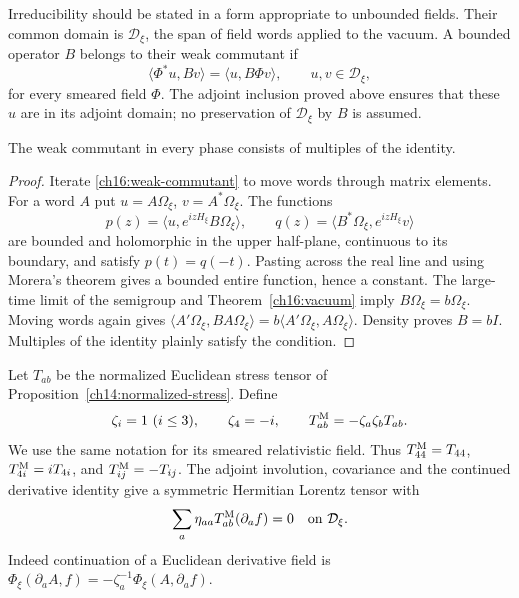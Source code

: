 Irreducibility should be stated in a form appropriate to unbounded fields.
Their common domain is $\mathcal D_\xi$, the span of field words applied
to the vacuum. A bounded operator $B$ belongs to their weak commutant if
\begin{equation}
 \langle\Phi^*u,Bv\rangle=\langle u,B\Phi v\rangle,
 \qquad u,v\in\mathcal D_\xi,
 \label{ch16:weak-commutant}
\end{equation}
for every smeared field $\Phi$. The adjoint inclusion proved above
ensures that these $u$ are in its adjoint domain; no preservation of
$\mathcal D_\xi$ by $B$ is assumed.

\begin{proposition}
\label{ch16:irreducible}
The weak commutant in every phase consists of multiples of the identity.
\end{proposition}
\begin{proof}
Iterate \eqref{ch16:weak-commutant} to move words through matrix elements.
For a word $A$ put $u=A\Omega_\xi$, $v=A^*\Omega_\xi$. The functions
\[
 p(z)=\langle u,e^{izH_\xi}B\Omega_\xi\rangle,\qquad
 q(z)=\langle B^*\Omega_\xi,e^{izH_\xi}v\rangle
\]
are bounded and holomorphic in the upper half-plane, continuous to its
boundary, and satisfy $p(t)=q(-t)$. Pasting across the real line and
using Morera's theorem gives a bounded entire function, hence a constant.
The large-time limit of the semigroup and Theorem~\ref{ch16:vacuum} imply
$B\Omega_\xi=b\Omega_\xi$. Moving words again gives
$\langle A'\Omega_\xi,BA\Omega_\xi\rangle
=b\langle A'\Omega_\xi,A\Omega_\xi\rangle$.
Density proves $B=bI$. Multiples of the identity plainly satisfy the condition.
\end{proof}

Let $T_{ab}$ be the normalized Euclidean stress tensor of
Proposition~\ref{ch14:normalized-stress}. Define
\[
 \zeta_i=1\ (i\le3),\qquad\zeta_4=-i,
 \qquad T^{\rm M}_{ab}=-\zeta_a\zeta_bT_{ab}.
\]
We use the same notation for its smeared relativistic field. Thus
$T^{\rm M}_{44}=T_{44}$, $T^{\rm M}_{4i}=iT_{4i}$, and
$T^{\rm M}_{ij}=-T_{ij}$. The adjoint involution, covariance and the
continued derivative identity give a symmetric Hermitian Lorentz tensor
with
\[
 \sum_a\eta_{aa}T^{\rm M}_{ab}(\partial_a f)=0
                      \quad\hbox{on }\mathcal D_\xi.
\]
Indeed continuation of a Euclidean derivative field is
$\Phi_\xi(\partial_a A,f)=-\zeta_a^{-1}\Phi_\xi(A,\partial_a f)$.

